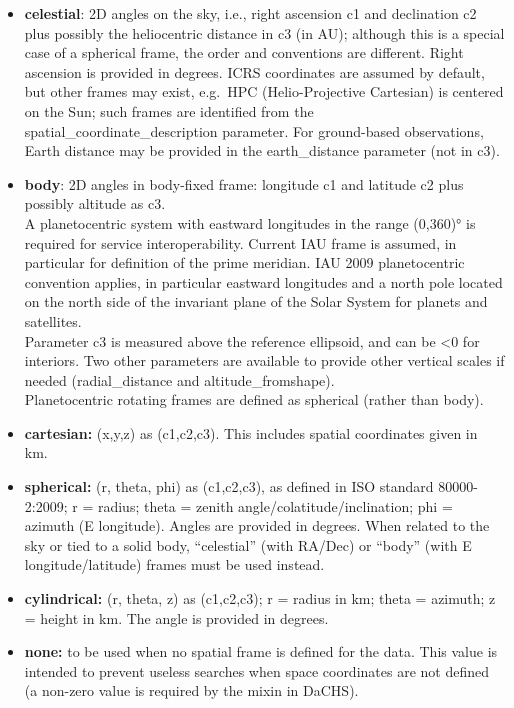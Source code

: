 \documentclass[11pt,a4paper]{ivoa}
\begin{document}
\begin{itemize}
\item \textbf{celestial}: 2D angles on the sky, i.e., right ascension
c1 and declination c2 plus possibly the heliocentric distance in c3 (in AU);
although this is a special case of a spherical frame, the order and
conventions are different. Right ascension is provided in degrees. ICRS
coordinates are assumed by default, but other frames may exist, e.g.\ HPC
(Helio-Projective Cartesian) is centered on the Sun; such frames are
identified from the spatial\_coordinate\_description parameter.
For ground-based observations, Earth distance may be provided in the
earth\_distance parameter (not in c3).

\item \textbf{body}: 2D angles in body-fixed frame: longitude c1 and
latitude c2 plus possibly altitude as c3. \\A planetocentric system with
eastward longitudes in the range (0,360)° is required for service
interoperability. Current IAU frame is assumed, in particular for
definition of the prime meridian. IAU 2009 planetocentric convention
applies, in particular eastward longitudes and a north pole located on
the north side of the invariant plane of the Solar System for planets
and satellites.  \\Parameter c3 is measured above the reference
ellipsoid, and can be <0 for interiors. Two other parameters are
available to provide other vertical scales if needed (radial\_distance
and altitude\_fromshape). \\Planetocentric rotating frames are defined
as spherical (rather than body).

\item \textbf{cartesian:} (x,y,z) as (c1,c2,c3).
This includes spatial coordinates given in km.

\item \textbf{spherical:} (r, theta, phi) as (c1,c2,c3), as
defined in ISO standard 80000-2:2009; r = radius; theta = zenith
angle/colatitude/inclination; phi = azimuth (E longitude). Angles are
provided in degrees. When related to the sky or tied to a solid body,
``celestial'' (with RA/Dec) or ``body'' (with E longitude/latitude)
frames must be used instead.

\item \textbf{cylindrical:} (r, theta, z) as (c1,c2,c3); r = radius in
km; theta = azimuth; z = height in km. The angle is provided in degrees.

\item \textbf{none:} to be used when no spatial frame is defined for
the data. This value is intended to prevent useless searches when space
coordinates are not defined (a non-zero value is required by the mixin
in DaCHS).

\end{itemize}
\end{document}
